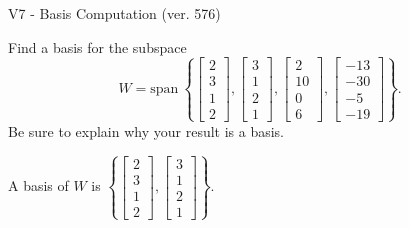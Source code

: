 \begin{exercise}
  \begin{exerciseTitle}V7 - Basis Computation (ver. 576)\end{exerciseTitle}
  \begin{exerciseStatement}
    Find a basis for the subspace 
\[W=\mathrm{span}\ \left\{\left[\begin{array}{r}
2 \\
3 \\
1 \\
2
\end{array}\right] , \left[\begin{array}{r}
3 \\
1 \\
2 \\
1
\end{array}\right] , \left[\begin{array}{r}
2 \\
10 \\
0 \\
6
\end{array}\right] , \left[\begin{array}{r}
-13 \\
-30 \\
-5 \\
-19
\end{array}\right]\right\}.\]
 Be sure to explain why your result is a basis.


  \end{exerciseStatement}
  \begin{exerciseAnswer}
   A basis of \(W\) is  \(\left\{\left[\begin{array}{r}
2 \\
3 \\
1 \\
2
\end{array}\right] , \left[\begin{array}{r}
3 \\
1 \\
2 \\
1
\end{array}\right]\right\}\).
  


  \end{exerciseAnswer}
\end{exercise}
